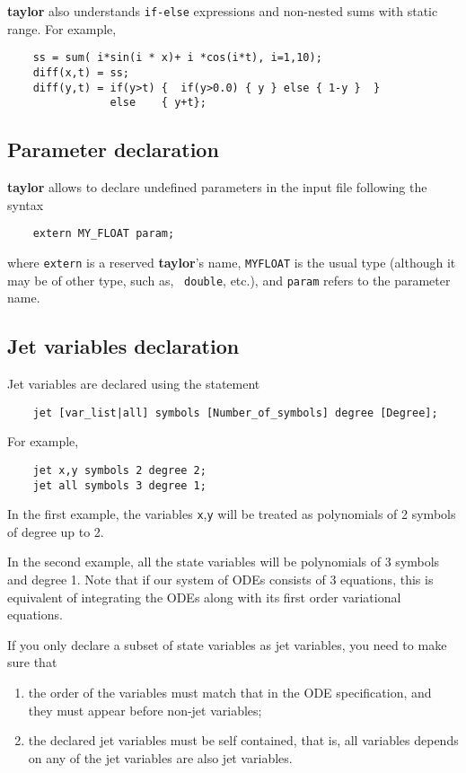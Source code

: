 \documentclass[10pt]{article}
\theoremstyle{remark}
\newcommand{\taylorname}{{\bf taylor}}
\newcommand{\myfloat}{{\tt MY\symbol{95}FLOAT}}
\begin{document}
\medskip 

\taylorname{} also understands {\tt if-else} expressions and
non-nested sums with static range. For example,
\begin{verbatim}
    ss = sum( i*sin(i * x)+ i *cos(i*t), i=1,10);
    diff(x,t) = ss;
    diff(y,t) = if(y>t) {  if(y>0.0) { y } else { 1-y }  }
                else    { y+t};
\end{verbatim}

\subsection*{Parameter declaration}
\taylorname{} allows to declare undefined parameters in the input file
following the syntax
\begin{verbatim}
    extern MY_FLOAT param;
\end{verbatim}
where {\tt extern} is a reserved \taylorname{}'s name, \myfloat{} is
the usual type (although it may be of other type, such as, {\tt
  double}, etc.), and {\tt param} refers to the parameter name.

\subsection*{Jet variables declaration}
Jet variables are declared using the statement
\begin{verbatim}
    jet [var_list|all] symbols [Number_of_symbols] degree [Degree];
\end{verbatim}
For example,
\begin{verbatim}
    jet x,y symbols 2 degree 2;
    jet all symbols 3 degree 1;
\end{verbatim}
In the first example, the variables {\tt x},{\tt y} will be treated as
polynomials of 2 symbols of degree up to 2.

In the second example, all the state variables will be polynomials of
3 symbols and degree 1. Note that if our system of ODEs consists of 3
equations, this is equivalent of integrating the ODEs along with its
first order variational equations.

\bigskip

If you only declare a subset of state variables as jet variables, you
need to make sure that
\begin{enumerate}
\renewcommand{\theenumi}{A\arabic{enumi}}
\renewcommand{\labelenumi}{\theenumi.)}
    \item\label{A1} the order of the variables must match that in the
      ODE specification, and they must appear before non-jet
      variables;
    \item\label{A2} the declared jet variables must be self contained,
      that is, all variables depends on any of the jet variables are
      also jet variables.
\end{enumerate}
\end{document}
